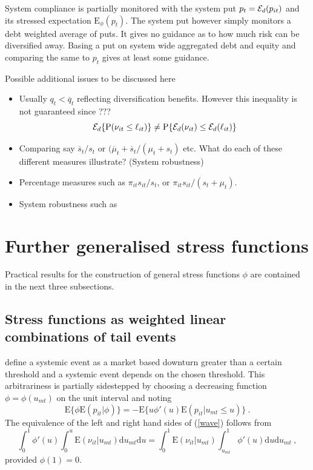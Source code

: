 \documentclass[authoryear]{elsarticle}
\newcommand{\E}{\mathrm{E}}
\newcommand{\Ex}{{\cal E}}
\newcommand{\Exd}{\Ex_d}
\newcommand{\Es}{\E_\phi}
\newcommand{\bi}{\begin{itemize}}
\newcommand{\ei}{\end{itemize}}
\renewcommand{\i}{\item}
\newcommand{\de}{\mathrm{d}}
\newcommand{\eref}[1]{(\ref{#1})}
\renewcommand{\P}{\mathrm{P}}
\newcommand{\be}[1]{\begin{equation}\label{#1}}
\newcommand{\ee}{\end{equation}}
\begin{document}
System compliance  is partially monitored with the system put $p_t=\Exd(p_{it})$ and its stressed expectation $\Es(p_t)$.   The system put however simply monitors a debt weighted average of puts.   It gives no guidance as to how much risk can be diversified away.   Basing a put on system wide aggregated debt and equity and comparing the same to $p_t$  gives at least some guidance.

Possible additional issues to be discussed here
\bi
\i  Usually  $q_t<\overline q_t$ reflecting diversification benefits.   However this inequality is not guaranteed since ???
$$
\Ex_d\{\P (\nu_{it}\le \ell_{it})\} \ne  \P\{\Ex_d(\nu_{it})\le \Ex_d(\ell_{it})\}
$$
\i   Comparing say $\overline s_t/s_t$ or $(\overline\mu_t+\overline s_t/(\mu_t+s_t)$ etc.   What do each of these different measures illustrate? (System robustness)
\i   Percentage measures such as  $\pi_{it}s_{it}/s_t$,  or $\pi_{it}s_{it}/(s_t+\mu_t)$.
\i  System robustness such as 
\ei    










 
 \section{Further generalised stress functions}\label{genstress}
 
Practical results for the  construction of general stress functions $\phi$ are contained in the next three subsections.

 
 \subsection{Stress functions as  weighted linear combinations of tail events}
 

\cite{brownlees2015} define a systemic event as a market based downturn greater than a certain threshold and a systemic event  depends on the chosen threshold.   This arbitrariness is partially sidestepped by choosing a decreasing function $\phi=\phi(u_{mt})$ on the unit interval and noting 
\be{wave}
\E\{\phi\E(p_{it}|\phi)\} = -\E\{u\phi'(u)\E(p_{it}|u_{mt}\le u)\}\ .
\ee
The equivalence of the left and right hand sides of \eref{wave}  follows from 
$$
\int_0^1 \phi'(u)  \int_0^u \E(\nu_{it}|u_{mt})\de u_{mt}   \de u =\int_0^1\E(\nu_{it}|u_{mt})\int_{u_{mt}}^1  \phi'(u) \de u \de u_{mt}\ ,   
$$
provided $\phi(1)=0$.
\end{document}
